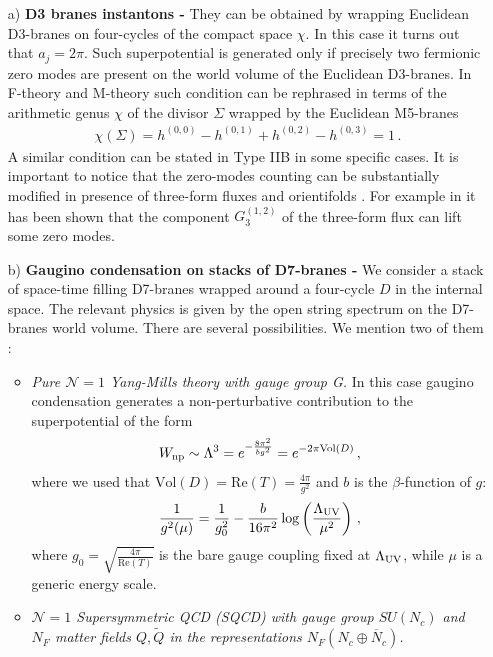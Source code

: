 \documentclass[12pt,a4paper]{book}
\begin{document}
\begin{itemize}
 \item[a)] \textbf{D3 branes instantons - } They can be obtained by wrapping Euclidean D3-branes on four-cycles of the compact space $\chi$. In this case it turns out that $a_j = 2 \pi$. Such superpotential is generated only if precisely two fermionic zero modes are present on the world volume of the Euclidean D3-branes. In F-theory and M-theory such condition can be rephrased in terms of the arithmetic genus $\chi$ of the divisor $\Sigma$ wrapped by the Euclidean M5-branes \cite{Witten:1996bn}
\begin{align}
\chi(\Sigma) = h^{(0,0)} - h^{(0,1)} + h^{(0,2)} - h^{(0,3)} = 1\,.
\end{align}
A similar condition can be stated in Type IIB in some specific cases. It is important to notice that the zero-modes counting can be substantially modified in presence of three-form fluxes and orientifolds \cite{Bergshoeff:2005yp, Lust:2006zg, Kallosh:2005yu, Kallosh:2005gs}. For example in \cite{Lust:2005cu} it has been shown that the component $G^{(1,2)}_3$ of the three-form flux can lift some zero modes.
\item[b)] \textbf{Gaugino condensation on stacks of D7-branes -} We consider a stack of space-time filling D7-branes wrapped around a four-cycle $D$ in the internal space. The relevant physics is given by the open string spectrum on the D7-branes world volume. There are several possibilities. We mention two of them \cite{Lust:2005dy, Intriligator:1995au}:
 \begin{itemize}
 \item \textit{Pure $\mathcal{N} = 1$ Yang-Mills theory with gauge group G.}
 In this case gaugino condensation generates a non-perturbative contribution to the superpotential of the form
 \begin{align}
 \label{eq:PureYMSuperpotential}
 W_{\rm np} \sim \Lambda^3 = e^{- \frac{8 \pi^2}{b g^2}} = e^{- 2 \pi \text{Vol}(D)}\,,
 \end{align}
 where we used that $\text{Vol}(D) = \text{Re}(T) = \frac{4 \pi}{g^2}$ and $b$ is the $\beta$-function of $g$:
 \begin{align}
 \label{eq:BetaFunction}
 \frac{1}{g^2(\mu)} = \frac{1}{g_0^2} - \frac{b}{16 \pi^2} \log \left(\frac{\Lambda_{\rm UV}}{\mu^2}\right)\,,
 \end{align}
 where $g_0 = \sqrt{\frac{4 \pi}{\text{Re}(T)}}$ is the bare gauge coupling fixed at $\Lambda_{\rm UV}$, while $\mu$ is a generic energy scale.
 \item \textit{$\mathcal{N} = 1$ Supersymmetric QCD (SQCD) with gauge group $SU(N_c)$ and $N_F$ matter fields $Q, \tilde{Q}$ in the representations $N_F \left(N_c \oplus \overline{N}_c\right)$.}

\end{itemize}
\end{itemize}
\end{document}
